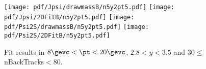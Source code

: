 \begin{figure}[H]
\begin{center}
\texttt{[image: pdf/Jpsi/drawmassB/n5y2pt5.pdf]}
\texttt{[image: pdf/Jpsi/2DFitB/n5y2pt5.pdf]}
\vspace*{-0.5cm}
\texttt{[image: pdf/Psi2S/drawmassB/n5y2pt5.pdf]}
\texttt{[image: pdf/Psi2S/2DFitB/n5y2pt5.pdf]}
\vspace*{-0.5cm}
\end{center}
\caption{Fit results in $8\gevc<\pt<20\gevc$, $2.8<y<3.5$ and 30$\leq$nBackTracks$<$80.}
\label{Fitn5y2pt5}
\end{figure}
